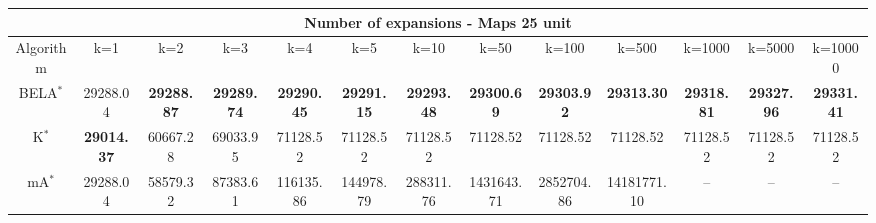 \begin{tabular}{c|cccccccccccc}\toprule
\multicolumn{13}{c}{Number of expansions - Maps 25 unit}\\ \midrule
Algorithm & k=1 & k=2 & k=3 & k=4 & k=5 & k=10 & k=50 & k=100 & k=500 & k=1000 & k=5000 & k=10000 \\ \midrule
BELA$^*$ & 29288.04 & \textbf{29288.87} & \textbf{29289.74} & \textbf{29290.45} & \textbf{29291.15} & \textbf{29293.48} & \textbf{29300.69} & \textbf{29303.92} & \textbf{29313.30} & \textbf{29318.81} & \textbf{29327.96} & \textbf{29331.41} \\
K$^*$ & \textbf{29014.37} & 60667.28 & 69033.95 & 71128.52 & 71128.52 & 71128.52 & 71128.52 & 71128.52 & 71128.52 & 71128.52 & 71128.52 & 71128.52 \\
mA$^*$ & 29288.04 & 58579.32 & 87383.61 & 116135.86 & 144978.79 & 288311.76 & 1431643.71 & 2852704.86 & 14181771.10 & -- & -- & -- \\ \bottomrule 
\end{tabular}
